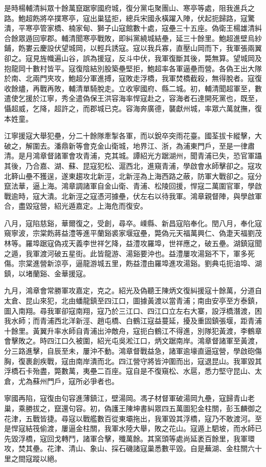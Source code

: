 \begin{pinyinscope}
是時楊輔清糾眾十餘萬竄踞寧國府城，復分黨屯聚團山、寒亭等處，阻我進兵之路。鮑超飭將卒撲寒亭，寇出巢猛拒，總兵宋國永橫躍入陣，伏起扼歸路，寇驚潰，平寒亭管家橋、楠家甸、獅子山寇館數十處，寇壘三十五座。偽衛王楊雄清糾合餘眾遁回寧郡。輔清聞寒亭戰敗，即糾黨繞城結壘，延三十餘里。鮑超進壁烏紗鋪，飭婁云慶設伏望城岡，以輕兵誘寇。寇以我兵寡，直壓山岡而下，我軍張兩翼卻之。寇見旌幟遍山谷，誤為援寇，反斗中伏，我軍復斷其後，斃無算。望城岡及抱龍岡十數村皆平。寇復陰結別股築壘堅拒，鮑超率各軍逼壘而營。各偽王出大隊於南、北兩門夾攻，鮑超分軍進搏，寇敗走浮橋，我軍焚橋截殺，無得脫者。寇復收餘燼，再戰再敗，輔清單騎脫走。立收寧國府、縣二城。初，輔清聞超軍至，數遣使乞援於江寧，秀全遣偽保王洪容海率悍寇赴之，容海者石達開死黨也，既至，懾超威，乞降，超許之，而郡城已克。容海奔廣德，襲獻州城，率眾六萬就撫，復本姓童。

江寧援寇大舉犯壘，分二十餘隊牽掣各軍，而以銳卒突雨花臺。國荃拔卡縱擊，大破之，解圍去。潘鼎新等會克金山衛城，地界江、浙，為浦東門戶，至是一律肅清。是月鴻章督諸軍會攻青浦，克其城。譚紹光方踞湖州，聞青浦已失，恐官軍躡其後，乃合嘉、湖、蘇、昆寇犯松、滬西北，進窺青浦，學啟會水師擊卻之。寇攻北簳山壘不獲逞，遂東趨攻北新涇，北新涇為上海西路之蔽，防軍大戰卻之。寇分竄法華，逼上海。鴻章調諸軍自金山衛、青浦、松陵回援，悍寇二萬圍官軍，學啟戰逾時，寇大潰。北新涇之寇憑河據壘，伏左右以待我軍。鴻章親督陣，與學啟軍合，盡毀寇營，紹光遁嘉定。上海危而復安。

八月，寇陷慈谿，華爾復之，受創，尋卒。嵊縣、新昌寇陷奉化。閏八月，奉化寇窺寧波，宗棠飭蔣益澧等進平蘭谿裘家堰寇壘，斃偽元天福萬興仁、偽疌天福劉茂林等。羅埠踞寇偽戎天義李世祥乞降，益澧攻羅埠，世祥應之，破五壘。湖鎮寇聞之遁，我軍渡河破五星街。此皆龍游、湯谿要沖也。益澧屢攻湯谿不下，軍多死傷。宗棠進營新涼亭，逼龍游城五里，飭益澧由羅埠進攻湯谿。劉典屯扼油埠、湖鎮，以堵蘭谿、金華援寇。

九月，鴻章會常勝軍攻嘉定，克之。紹光及偽聽王陳炳文復糾援寇十餘萬，分道自太倉、昆山來犯，北由蟠龍鎮至四江口，圖據黃渡以當青浦；南由安亭至方泰鎮，圖入南翔。尋我軍卻寇南翔，寇乃於三江口、四江口立左右大寨，設浮橋潛渡，困我水師；而青浦西北洋新涇、趙屯橋、白鶴江寇益蔓延，擾及重固鎮張堰，距青浦十餘里。黃翼升率水師自青浦出沖敵舟，寇扼白鶴江不得進，別隊犯黃渡，李鶴章會擊敗之。時四江口久被圍，紹光屯吳淞江口，炳文踞南岸。鴻章督諸軍至黃渡，分三路進擊，自辰至未，屢沖不動。鴻章督戰益急，諸軍逾壕直逼寇營，學啟砲傷胸，復裹創疾戰，寇由南岸潰而北。四江營守將皆沖圍而出，寇退昆山。我軍毀其浮橋石卡殆盡，斃數萬，夷壘二百座。寇自是不復窺松、水扈，悉力堅守昆山、太倉，尤為蘇州門戶，寇所必爭者也。

寧國再陷，寇復由句容進薄鎮江，壁湯岡。馮子材督軍破湯岡九壘，寇歸青山老巢，乘勝拔之，竄還句容。初，偽護王陳坤書糾眾四五萬圖犯金柱關，彭玉麟御之花津，五戰皆捷。尋寇以戰艦數百從東壩拖出，我軍毀其浮橋，寇乃不敢渡河。至是悍寇結筏偷渡，屢逼金柱關，我軍水陸大舉，敗之花山。寇遁上駟坡，而水師已先毀浮橋，寇回戈轉鬥，諸軍合擊，殲萬餘。其窯頭等處尚延袤百餘里，我軍環攻，焚其壘。花津、清山、象山、採石磯諸寇巢悉數平毀。自是蕪湖、金柱關六十里之間寇蹤以絕。


\end{pinyinscope}
